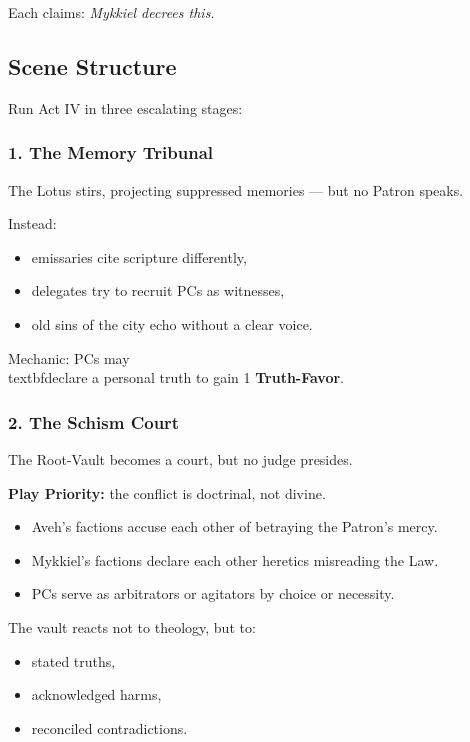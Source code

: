 \documentclass[11pt]{article}
\newcommand{\Term}[1]{\textbf{#1}}
\begin{document}
Each claims:
\emph{Mykkiel decrees this.}

\bigskip

\subsection*{Scene Structure}

Run Act IV in three escalating stages:

\subsubsection*{1. The Memory Tribunal}

The Lotus stirs, projecting suppressed memories ---
but no Patron speaks.

Instead:
\begin{itemize}[leftmargin=*]
  \item emissaries cite scripture differently,
  \item delegates try to recruit PCs as witnesses,
  \item old sins of the city echo without a clear voice.
\end{itemize}

Mechanic: PCs may \\textbf{declare a personal truth} to gain 1 \Term{Truth-Favor}.

\bigskip

\subsubsection*{2. The Schism Court}

The Root-Vault becomes a court, but no judge presides.

\textbf{Play Priority:} the conflict is doctrinal, not divine.

\begin{itemize}[leftmargin=*]
  \item Aveh's factions accuse each other of betraying the Patron's mercy.
  \item Mykkiel's factions declare each other heretics misreading the Law.
  \item PCs serve as arbitrators or agitators by choice or necessity.
\end{itemize}

The vault reacts not to theology, but to:
\begin{itemize}[leftmargin=*]
  \item stated truths,
  \item acknowledged harms,
  \item reconciled contradictions.
\end{itemize}
\end{document}
